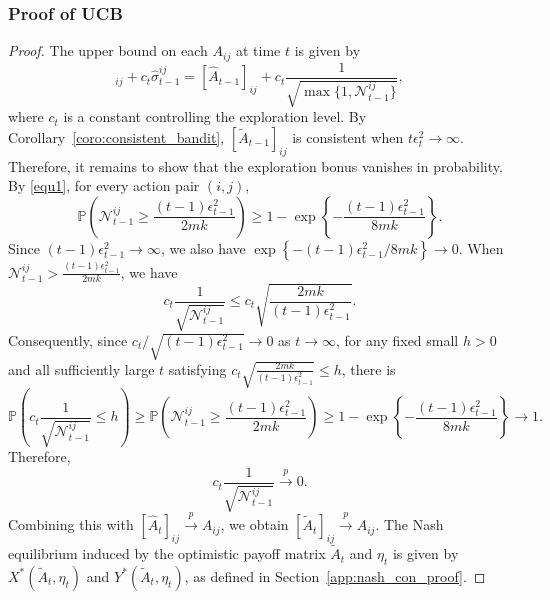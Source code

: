 \documentclass[12pt]{article}
\begin{document}
\subsubsection{Proof of UCB}
\label{app:nash_behave_proof_ucb}
\begin{proof}
The upper bound on each $A_{ij}$ at time $t$ is given by
\begin{equation*}
[\widehat{A}_{t-1}]_{i j}+c_t \widehat{\sigma}_{t-1}^{ij} = [\widehat{A}_{t-1}]_{i j}+c_t \frac{1}{\sqrt{\max\{1,\mathcal{N}_{t-1}^{ij}\}}},
\end{equation*}
where $c_t$ is a constant controlling the exploration level. By Corollary~\ref{coro:consistent_bandit}, $[\widetilde{A}_{t-1}]_{i j}$ is consistent when $t\epsilon_t^2 \to \infty$. Therefore, it remains to show that the
exploration bonus vanishes in probability. By \eqref{equ1}, for every action pair $(i,j)$,
\begin{equation*}
\mathbb P\left(
\mathcal N_{t-1}^{ij}\ge
\frac{(t-1) \epsilon_{t-1}^2}{2mk}
\right) \ge
1- \exp\left\{ -\frac{(t-1) \epsilon_{t-1}^2}{8mk} \right\}.
\end{equation*}
Since $(t-1) \epsilon_{t-1}^2\to\infty$, we also have $\exp\left\{ -{(t-1) \epsilon_{t-1}^2}/{8mk} \right\} \to 0$. When $\mathcal N_{t-1}^{ij} > \frac{(t-1) \epsilon_{t-1}^2}{2mk}$, we have
\[
c_t
\frac{1}{\sqrt{\mathcal N_{t-1}^{ij}}}
\le
c_t \sqrt{\frac{2mk}{(t-1) \epsilon_{t-1}^2}}.
\]
Consequently, since $c_t/\sqrt{(t-1) \epsilon_{t-1}^2}\to 0$ as $t \to\infty$, for any fixed small $h>0$ and all sufficiently large $t$ satisfying $c_t \sqrt{\frac{2mk}{(t-1) \epsilon_{t-1}^2} } \le h$, there is
\[
\mathbb P\left( c_t \frac{1}{\sqrt{\mathcal N_{t-1}^{ij}}} \le h \right)
\ge
\mathbb P\left( \mathcal N_{t-1}^{ij} \ge \frac{(t-1) \epsilon_{t-1}^2}{2mk} \right)
\ge
1 - \exp\left\{ -\frac{(t-1) \epsilon_{t-1}^2}{8mk} \right\}
\to 1.
\]
Therefore,
\begin{equation}
\label{equ3}
c_t \frac{1}{\sqrt{\mathcal N_{t-1}^{ij}}} \stackrel{p}{\to} 0.    
\end{equation}
Combining this with $[\widehat A_t]_{ij} \stackrel{p}{\to} A_{ij}$, we obtain $[\widetilde A_t]_{ij} \stackrel{p}{\to} A_{ij}$. 
The Nash equilibrium induced by the optimistic payoff matrix $\widetilde A_t$ and $\eta_t$ is given by $X^\ast(\widetilde A_t,\eta_t)$ and $Y^\ast(\widetilde A_t,\eta_t)$, as defined in Section~\ref{app:nash_con_proof}. 


\end{proof}
\end{document}
